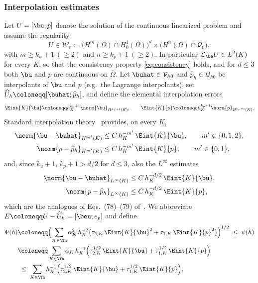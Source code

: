 \subsubsection{Interpolation estimates}
Let $U=[\bu;p]$ denote the solution of the continuous linearized problem and assume the
regularity
\begin{equation}\label{eq:regularity}
  U\in\mathcal{W}_r \coloneqq
  \bigl(H^{m}(\Omega)\cap H^1_0(\Omega)\bigr)^d
  \times\bigl(H^{n}(\Omega)\cap\mathcal{Q}_0\bigr),
\end{equation}
with $m\ge k_u+1\ (\ge 2)$ and $n\ge k_p+1\ (\ge 2)$.
In particular
$\mathcal{L}_{\ba}U\in L^2(K)$ for every $K$, so that the consistency property
\eqref{eq:consistency} holds, and for $d\le3$ both $\bu$ and $p$ are continuous on
$\overline{\Omega}$. Let $\buhat\in\mathcal{V}_{h0}$ and
$\widehat{p}_h\in\mathcal{Q}_{h0}$ be interpolants of $\bu$ and $p$
(e.g.\ the Lagrange interpolants), set
$\widehat{U}_h\coloneqq[\buhat;\widehat{p}_h]$, and define the elemental interpolation
errors
\begin{equation}\label{eq:Eint}
  \Eint{K}{\bu}\coloneqq h_K^{k_u+1}\norm{\bu}_{H^{k_u+1}(K)},
  \qquad
  \Eint{K}{p}\coloneqq h_K^{k_p+1}\norm{p}_{H^{k_p+1}(K)} .
\end{equation}
Standard interpolation theory~\cite{brenner2008mathematical,ernguermond} provides, on every $K$,
\begin{equation}\label{eq:interp}
\begin{aligned}
  \norm{\bu-\buhat}_{H^{m'}(K)} &\le C\,h_K^{-m'}\,\Eint{K}{\bu},
  \qquad m'\in\{0,1,2\},\\
  \norm{p-\widehat{p}_h}_{H^{m'}(K)} &\le C\,h_K^{-m'}\,\Eint{K}{p},
  \qquad m'\in\{0,1\},
\end{aligned}
\end{equation}
and, since $k_u+1,\,k_p+1>d/2$ for $d\le3$, also the $L^\infty$ estimates
\begin{equation}\label{eq:interpinfty}
\begin{aligned}
  \norm{\bu-\buhat}_{L^\infty(K)} &\le C\,h_K^{-d/2}\,\Eint{K}{\bu},\\
  \norm{p-\widehat{p}_h}_{L^\infty(K)} &\le C\,h_K^{-d/2}\,\Eint{K}{p},
\end{aligned}
\end{equation}
which are the analogues of Eqs.~(78)--(79) of~\cite{codina2001stabilized}. We abbreviate
$E\coloneqq U-\widehat{U}_h=[\beu;e_p]$ and define
\begin{equation}\label{eq:psih}
\begin{aligned}
  \Psi(h)
  &\coloneqq \Bigl(\sum_{K\in\Th}\alpha_K^2\,h_K^{-2}
  \bigl(\tau_{2,K}\,\Eint{K}{\bu}^2+\tau_{1,K}\,\Eint{K}{p}^2\bigr)\Bigr)^{1/2}
  \;\le\;
  \psi(h) \\
  &\coloneqq \sum_{K\in\Th}\alpha_K\,h_K^{-1}
  \Bigl(\tau_{2,K}^{1/2}\,\Eint{K}{\bu}+\tau_{1,K}^{1/2}\,\Eint{K}{p}\Bigr) \\
  &\;\le\;
  \sum_{K\in\Th}h_K^{-1}
  \Bigl(\tau_{2,K}^{1/2}\,\Eint{K}{\bu}+\tau_{1,K}^{1/2}\,\Eint{K}{p}\Bigr),
\end{aligned}
\end{equation}
